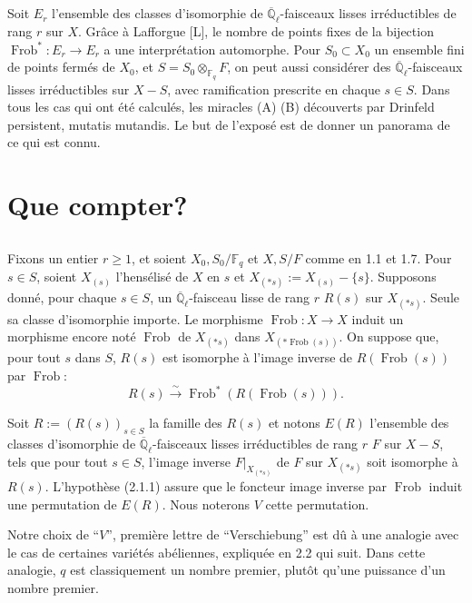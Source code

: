 \documentclass[11pt,a4paper]{article}
\theoremstyle{plain}
\theoremstyle{definition}
\DeclareMathOperator{\Frob}{Frob}
\newcommand{\F}{\mathbb{F}}
\newcommand{\Ql}{\overline{\mathbb{Q}}_\ell}
\begin{document}
\subsection{}
Soit $E_r$ l'ensemble des classes d'isomorphie de $\Ql$-faisceaux lisses irr\'eductibles de rang $r$ sur $X$. Gr\^ace \`a Lafforgue [L], le nombre de points fixes de la bijection $\Frob^*: E_r \to E_r$ a une interpr\'etation automorphe. Pour $S_0 \subset X_0$ un ensemble fini de points ferm\'es de $X_0$, et $S = S_0 \otimes_{\F_q} F$, on peut aussi consid\'erer des $\Ql$-faisceaux lisses irr\'eductibles sur $X - S$, avec ramification prescrite en chaque $s \in S$. Dans tous les cas qui ont \'et\'e calcul\'es, les miracles (A) (B) d\'ecouverts par Drinfeld persistent, mutatis mutandis. Le but de l'expos\'e est de donner un panorama de ce qui est connu.

\section{Que compter?}

\subsection{}
Fixons un entier $r \geq 1$, et soient $X_0, S_0/\F_q$ et $X, S/F$ comme en 1.1 et 1.7. Pour $s \in S$, soient $X_{(s)}$ l'hens\'elis\'e de $X$ en $s$ et $X_{(*s)} := X_{(s)} - \{s\}$. Supposons donn\'e, pour chaque $s \in S$, un $\Ql$-faisceau lisse de rang $r$ $R(s)$ sur $X_{(*s)}$. Seule sa classe d'isomorphie importe. Le morphisme $\Frob: X \to X$ induit un morphisme encore not\'e $\Frob$ de $X_{(*s)}$ dans $X_{(*\Frob(s))}$. On suppose que, pour tout $s$ dans $S$, $R(s)$ est isomorphe \`a l'image inverse de $R(\Frob(s))$ par $\Frob$:
\begin{equation}
R(s) \xrightarrow{\sim} \Frob^*(R(\Frob(s))).
\tag{2.1.1}
\end{equation}

Soit $R := (R(s))_{s \in S}$ la famille des $R(s)$ et notons $E(R)$ l'ensemble des classes d'isomorphie de $\Ql$-faisceaux lisses irr\'eductibles de rang $r$ $F$ sur $X - S$, tels que pour tout $s \in S$, l'image inverse $F|_{X_{(*s)}}$ de $F$ sur $X_{(*s)}$ soit isomorphe \`a $R(s)$. L'hypoth\`ese (2.1.1) assure que le foncteur image inverse par $\Frob$ induit une permutation de $E(R)$. Nous noterons $V$ cette permutation.

Notre choix de ``$V$'', premi\`ere lettre de ``Verschiebung'' est d\^u \`a une analogie avec le cas de certaines vari\'et\'es ab\'eliennes, expliqu\'ee en 2.2 qui suit. Dans cette analogie, $q$ est classiquement un nombre premier, plut\^ot qu'une puissance d'un nombre premier.
\end{document}
